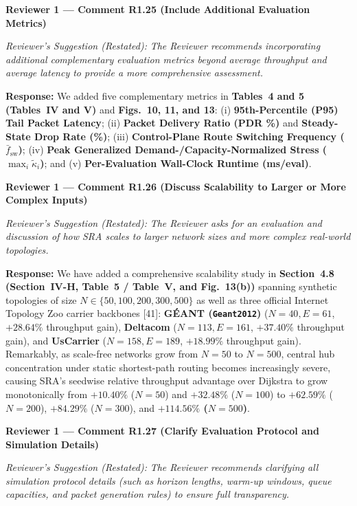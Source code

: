 \documentclass[11pt,a4paper]{article}
\newcommand{\cbox}[2]{%
  \vspace{0.6em}\noindent\textbf{#1}\par\smallskip
  \noindent\textit{Reviewer's Suggestion (Restated):} \textit{#2}\par\smallskip
}
\begin{document}
\hrulefill

\cbox{Reviewer 1 --- Comment R1.25 (Include Additional Evaluation Metrics)}{The Reviewer recommends incorporating additional complementary evaluation metrics beyond average throughput and average latency to provide a more comprehensive assessment.}

\noindent\textbf{Response:} We added five complementary metrics in \textbf{Tables~4 and 5 (Tables~IV and V)} and \textbf{Figs.~10, 11, and 13}: (i) \textbf{95th-Percentile (P95) Tail Packet Latency}; (ii) \textbf{Packet Delivery Ratio (PDR \%)} and \textbf{Steady-State Drop Rate (\%)}; (iii) \textbf{Control-Plane Route Switching Frequency ($\bar{f}_{\text{sw}}$)}; (iv) \textbf{Peak Generalized Demand-/Capacity-Normalized Stress ($\max_i\widetilde{\kappa}_i$)}; and (v) \textbf{Per-Evaluation Wall-Clock Runtime (ms/eval)}.

\hrulefill

\cbox{Reviewer 1 --- Comment R1.26 (Discuss Scalability to Larger or More Complex Inputs)}{The Reviewer asks for an evaluation and discussion of how SRA scales to larger network sizes and more complex real-world topologies.}

\noindent\textbf{Response:} We have added a comprehensive scalability study in \textbf{Section~4.8 (Section~IV-H, Table~5 / Table~V, and Fig.~13(b))} spanning synthetic topologies of size $N \in \{50, 100, 200, 300, 500\}$ as well as three official Internet Topology Zoo carrier backbones [41]: \textbf{G\'EANT (\texttt{Geant2012})} ($N=40, E=61$, $+28.64\%$ throughput gain), \textbf{Deltacom} ($N=113, E=161$, $+37.40\%$ throughput gain), and \textbf{UsCarrier} ($N=158, E=189$, $+18.99\%$ throughput gain). Remarkably, as scale-free networks grow from $N=50$ to $N=500$, central hub concentration under static shortest-path routing becomes increasingly severe, causing SRA's seedwise relative throughput advantage over Dijkstra to grow monotonically from $+10.40\%$ ($N=50$) and $+32.48\%$ ($N=100$) to $+62.59\%$ ($N=200$), $+84.29\%$ ($N=300$), and \textbf{$+114.56\%$ ($N=500$)}.

\hrulefill

\cbox{Reviewer 1 --- Comment R1.27 (Clarify Evaluation Protocol and Simulation Details)}{The Reviewer recommends clarifying all simulation protocol details (such as horizon lengths, warm-up windows, queue capacities, and packet generation rules) to ensure full transparency.}
\end{document}
